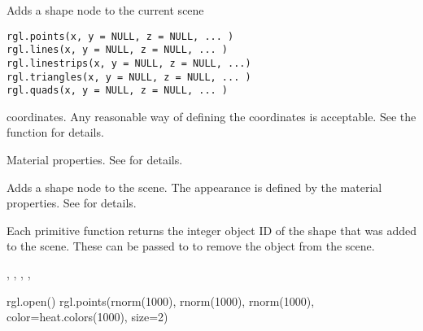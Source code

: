 \documentclass{article}
\begin{document}
\begin{Description}\relax
Adds a shape node to the current scene
\end{Description}
\begin{Usage}
\begin{verbatim}
rgl.points(x, y = NULL, z = NULL, ... )
rgl.lines(x, y = NULL, z = NULL, ... )
rgl.linestrips(x, y = NULL, z = NULL, ...)
rgl.triangles(x, y = NULL, z = NULL, ... )
rgl.quads(x, y = NULL, z = NULL, ... )
\end{verbatim}
\end{Usage}
\begin{Arguments}
\begin{ldescription}
\item[\code{x, y, z}] coordinates.  Any reasonable way of defining the
coordinates is acceptable.  See the function 
for details.
\item[\code{ ... }] Material properties. See  for details.
\end{ldescription}
\end{Arguments}
\begin{Details}\relax
Adds a shape node to the scene. The appearance is defined by the material properties.
See  for details.
\end{Details}
\begin{Value}
Each primitive function returns the integer object ID of the shape that
was added to the scene.  These can be passed to 
to remove the object from the scene.
\end{Value}
\begin{SeeAlso}\relax
{},
,
,
,
\end{SeeAlso}
\begin{Examples}
\begin{ExampleCode}
rgl.open()
rgl.points(rnorm(1000), rnorm(1000), rnorm(1000), color=heat.colors(1000), size=2)
\end{ExampleCode}
\end{Examples}
\end{document}
